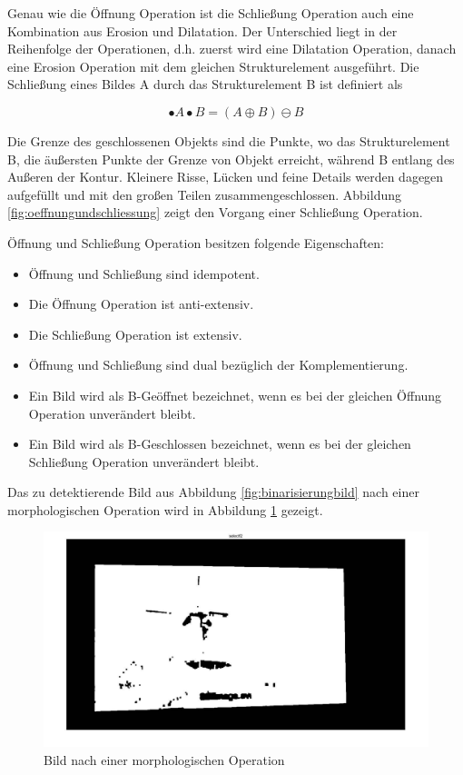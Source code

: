 Genau wie die Öffnung Operation ist die Schließung Operation auch eine Kombination aus Erosion und Dilatation. Der Unterschied liegt in der Reihenfolge der Operationen, d.h. zuerst wird eine Dilatation Operation, danach eine Erosion Operation mit dem gleichen Strukturelement ausgeführt. Die Schließung eines Bildes A durch das Strukturelement B ist definiert als

\begin{equation}
•A \bullet B =( A \oplus B )\ominus B  
\end{equation}

Die Grenze des geschlossenen Objekts sind die Punkte, wo das Strukturelement B, die äußersten Punkte der Grenze von Objekt erreicht, während B entlang des Außeren der Kontur. Kleinere Risse, Lücken und feine Details werden dagegen aufgefüllt und mit den großen Teilen zusammengeschlossen. Abbildung \ref{fig:oeffnungundschliessung} zeigt den Vorgang einer Schließung Operation.


Öffnung und Schließung Operation besitzen folgende Eigenschaften:

\begin{itemize}

\item Öffnung und Schließung sind idempotent.
\item Die Öffnung Operation ist anti-extensiv. 
\item Die Schließung Operation ist extensiv.
\item Öffnung und Schließung sind dual bezüglich der Komplementierung.
\item Ein Bild wird als B-Geöffnet bezeichnet, wenn es bei der gleichen Öffnung Operation unverändert bleibt. 
\item Ein Bild wird als B-Geschlossen bezeichnet, wenn es bei der gleichen Schließung Operation unverändert bleibt. 

\end{itemize}

Das zu detektierende Bild aus Abbildung \ref{fig:binarisierungbild} nach einer morphologischen Operation wird in Abbildung \ref{fig:Bild nach einer morphologischen Operation} gezeigt.

\begin{figure}[htb]
 \centering 
  \includegraphics[keepaspectratio,width=1.0\textwidth]{images/4_ZweiteErfahrung/Morphological/morpho.pdf}
 \caption{Bild nach einer morphologischen Operation}
 \label{fig:Bild nach einer morphologischen Operation}
\end{figure} 

